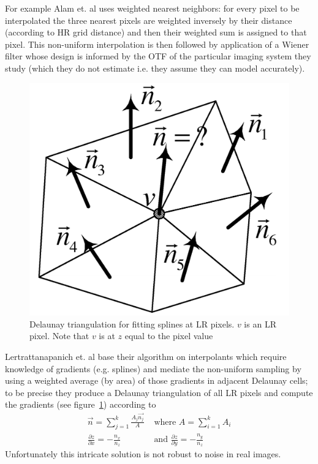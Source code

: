For example Alam et. al\cite{Alam2000} uses weighted nearest neighbors: for every pixel to be interpolated the three nearest pixels are weighted inversely by their distance (according to HR grid distance) and then their weighted sum is assigned to that pixel.
%
This non-uniform interpolation is then followed by application of a Wiener filter whose design is informed by the OTF of the particular imaging system they study (which they do not estimate i.e. they assume they can model accurately).
%
\begin{figure}
    \centering
    \includegraphics[width=.7\linewidth]{figures/delauney.png}
    \caption{Delaunay triangulation for fitting splines at LR pixels\cite{Lertrattanapanich}. $v$ is an LR pixel. Note that $v$ is at $z$ equal to the pixel value}
    \label{fig:delauney}
\end{figure}
Lertrattanapanich et. al\cite{Lertrattanapanich} base their algorithm on interpolants which require knowledge of gradients (e.g. splines) and mediate the non-uniform sampling by using a weighted average (by area) of those gradients in adjacent Delaunay cells; to be precise they produce a Delaunay triangulation of all LR pixels and compute the gradients (see figure~\ref{fig:delauney}) according to
\begin{align*}
    \vec{n} = \sum_{j=1}^k \frac{A_j \vec{n_j}}{A} &\text{ where } A=\sum_{i=1}^k A_i\\
    \frac{\partial z}{\partial x} = -\frac{n_x}{n_z} &\text{ and }  \frac{\partial z}{\partial y} = -\frac{n_y}{n_z}
\end{align*}
Unfortunately this intricate solution is not robust to noise in real images.

